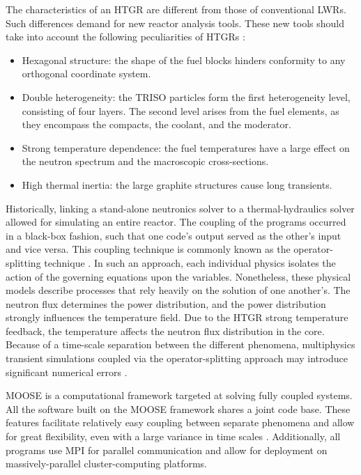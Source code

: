 The characteristics of an \gls{HTGR} are different from those of conventional \glspl{LWR}.
Such differences demand for new reactor analysis tools.
These new tools should take into account the following peculiarities of \glspl{HTGR} \cite{rohde_development_2012}\cite{bostelmann_criticality_2016}:
\begin{itemize}
\item Hexagonal structure: the shape of the fuel blocks hinders conformity to any orthogonal coordinate system.
\item Double heterogeneity: the TRISO particles form the first heterogeneity level, consisting of four
layers.
The second level arises from the fuel elements, as they encompass the compacts, the coolant, and the moderator.
\item Strong temperature dependence: the fuel temperatures have a large effect on the neutron spectrum and the macroscopic cross-sections.
\item High thermal inertia: the large graphite structures cause long transients.
\end{itemize}

Historically, linking a stand-alone neutronics solver to a thermal-hydraulics solver allowed for simulating an entire reactor.
The coupling of the programs occurred in a black-box fashion, such that one code's output served as the other's input and vice versa.
This coupling technique is commonly known as the operator-splitting technique \cite{ragusa_consistent_2009}.
In such an approach, each individual physics isolates the action of the governing equations upon the variables.
Nonetheless, these physical models describe processes that rely heavily on the solution of one another's.
The neutron flux determines the power distribution, and the power distribution strongly influences the temperature field.
Due to the \gls{HTGR} strong temperature feedback, the temperature affects the neutron flux distribution in the core.
Because of a time-scale separation between the different phenomena, multiphysics transient simulations coupled via the operator-splitting approach may introduce significant numerical errors \cite{ragusa_consistent_2009} \cite{park_tightly_2010}.

\gls{MOOSE} \cite{gaston_moose_2009} is a computational framework targeted at solving fully coupled systems.
All the software built on the \gls{MOOSE} framework shares a joint code base.
These features facilitate relatively easy coupling between separate phenomena and allow for great flexibility, even with a large variance in time scales \cite{novak_pronghorn_2018}.
Additionally, all programs use \gls{MPI} for parallel communication and allow for deployment on massively-parallel cluster-computing platforms.


